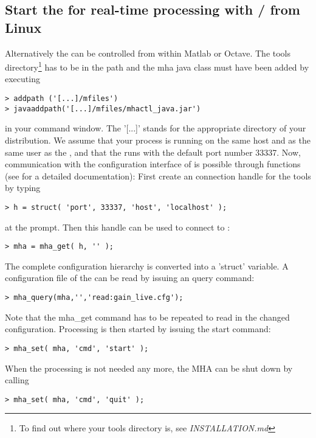 \subsection{Start the \mha{} for real-time processing with \Octave{}/\Matlab{} from Linux}%
%
Alternatively the \mhad{} can be controlled from within Matlab or Octave.
%
The \mha{} \Matlab{} tools directory\footnote{To find out where your \mha{}
  tools directory is, see \emph{INSTALLATION.md}} has to be in the \Matlab{} path and the mha
java class must have been added by executing
\begin{verbatim}
> addpath ('[...]/mfiles')
> javaaddpath('[...]/mfiles/mhactl_java.jar')
\end{verbatim}
in your \Matlab{} command window. The '[...]' stands for the appropriate
directory of your \mha{} distribution. 
%
We assume that your \Matlab{} process is running on the same host and
as the same user as the \mha{}, and that the \mhad{} runs with the
default port number 33337.
%
Now, communication with the configuration interface of \mha{} is
possible through \mha{} \Matlab{} functions (see 
for a detailed documentation):
%
First create an \mha{} connection handle for the \Matlab{} tools by
typing
\begin{verbatim}
> h = struct( 'port', 33337, 'host', 'localhost' );
\end{verbatim}
at the \Matlab{} prompt. Then this handle can be used to connect to \mha{}:
%
\begin{verbatim}
> mha = mha_get( h, '' );
\end{verbatim}
%
The complete \mha{} configuration hierarchy is converted into a \Matlab{}
'struct' variable.
%
A configuration file of the \mhad{} can be
read by issuing an \mha{} query command:
%
\begin{verbatim}
> mha_query(mha,'','read:gain_live.cfg');
\end{verbatim}
%
Note that the mha\_get command has to be repeated to read in the changed configuration.
%
Processing is then started by issuing the start command:
\begin{verbatim}
> mha_set( mha, 'cmd', 'start' );
\end{verbatim}
When the \mha{} processing is not needed any more, the MHA can be shut
down by calling
%
\begin{verbatim}
> mha_set( mha, 'cmd', 'quit' );
\end{verbatim}
